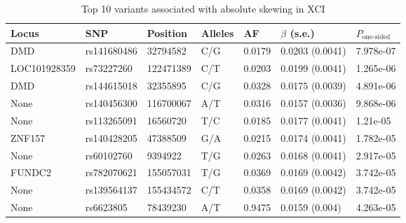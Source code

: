 \begin{table}[ht]
\scriptsize
\caption{Top 10 variants associated with absolute skewing in XCI}
\centering
\begin{tabular}{lllllll}
  \hline
Locus & SNP & Position & Alleles & AF & $\beta$ (s.e.) & $P_{\text{one-sided}}$ \\ 
  \hline
  DMD & rs141680486 & 32794582 & C/G & 0.0179 & 0.0203 (0.0041) & 7.978e-07 \\ 
  LOC101928359 & rs73227260 & 122471389 & C/T & 0.0203 & 0.0199 (0.0041) & 1.265e-06 \\ 
  DMD & rs144615018 & 32355895 & C/G & 0.0328 & 0.0175 (0.0039) & 4.891e-06 \\ 
  None & rs140456300 & 116700067 & A/T & 0.0316 & 0.0157 (0.0036) & 9.868e-06 \\ 
  None & rs113265091 & 16560720 & T/C & 0.0185 & 0.0177 (0.0041) & 1.21e-05 \\ 
  ZNF157 & rs140428205 & 47388509 & G/A & 0.0215 & 0.0174 (0.0041) & 1.782e-05 \\ 
  None & rs60102760 & 9394922 & T/G & 0.0263 & 0.0168 (0.0041) & 2.917e-05 \\ 
  FUNDC2 & rs782070621 & 155057031 & T/G & 0.0369 & 0.0169 (0.0042) & 3.742e-05 \\ 
  None & rs139564137 & 155434572 & C/T & 0.0358 & 0.0169 (0.0042) & 3.742e-05 \\ 
  None & rs6623805 & 78439230 & A/T & 0.9475 & 0.0159 (0.004) & 4.263e-05 \\ 
   \hline
\end{tabular}
\label{table:table4.3}
\end{table}